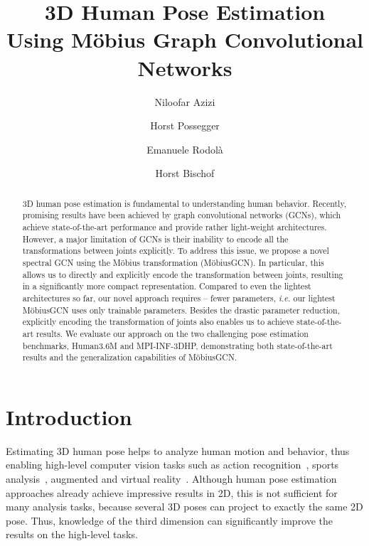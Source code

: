 \documentclass[runningheads]{llncs}
\begin{document}
\pagestyle{headings}
\mainmatter


\newcommand{\expect}[1]{\ensuremath{\operatorname{\mathbb{E}}\!\left[ #1 \right]}}
\newcommand{\var}[1]{\ensuremath{\operatorname{Var}\!\left[ #1 \right]}}
\newcommand{\ie}[0]{\emph{i.e. }}
\newcommand{\eg}[0]{\emph{e.g. }}



\title{3D Human Pose Estimation\\Using M\"obius Graph Convolutional Networks} 

\author{Niloofar Azizi \and
Horst Possegger \and
Emanuele Rodol\`a \and
Horst Bischof}



\maketitle
\begin{abstract}
3D human pose estimation is fundamental to understanding human behavior. Recently, promising results have been achieved by graph convolutional networks (GCNs), which achieve state-of-the-art performance and provide rather light-weight architectures.
However, a major limitation of GCNs is their inability to encode all the transformations between joints explicitly. To address this issue, we propose a novel spectral GCN using the M\"obius transformation (M\"obiusGCN). In particular, this allows us to directly and explicitly encode the transformation between joints, resulting in a significantly more compact representation. Compared to even the lightest architectures so far, our novel approach requires -- fewer parameters, \ie our lightest M\"obiusGCN uses only  trainable parameters. Besides the drastic parameter reduction, explicitly encoding the transformation of joints also enables us to achieve state-of-the-art results.
We evaluate our approach on the two challenging pose estimation benchmarks, Human3.6M and MPI-INF-3DHP, demonstrating both state-of-the-art results and the generalization capabilities of M\"obiusGCN.
\end{abstract}

\section{Introduction}
Estimating 3D human pose helps to analyze human motion and behavior, thus enabling high-level computer vision tasks such as action recognition~\cite{luvizon20182d}, sports analysis~\cite{wang2019ai, rematas2018soccer},  augmented and virtual reality~\cite{han2018viton}. Although human pose estimation approaches already achieve impressive results in 2D, this is not sufficient for many analysis tasks, because several 3D poses can project to exactly the same 2D pose. Thus, knowledge of the third dimension can significantly improve the results on the high-level tasks.
\end{document}

